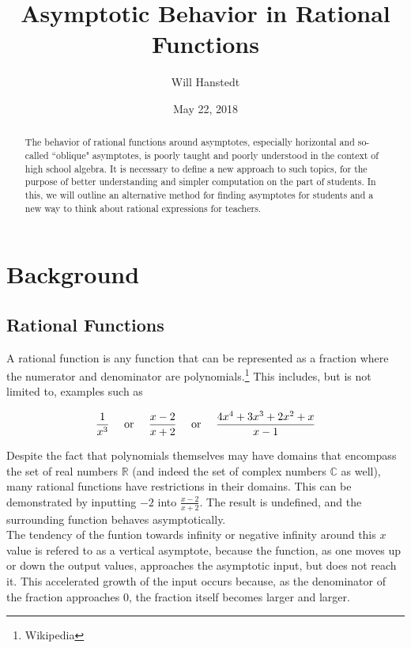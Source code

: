 \documentclass[12pt]{article}
\title{Asymptotic Behavior in Rational Functions}
\author{Will Hanstedt}
\date{May 22, 2018}
\begin{document}
\maketitle

\begin{abstract}
The behavior of rational functions around asymptotes, especially 		%
horizontal and so-called ``oblique" asymptotes, is poorly taught 
and poorly understood in the context of high school algebra. It is
necessary to define a new approach to such topics, for the purpose
of better understanding and simpler computation on the part of 
students. In this, we will outline an alternative method for 
finding asymptotes for students and a new way to think about 
rational expressions for teachers.
\end{abstract}

\section{Background}
\subsection{Rational Functions}

A rational function is any function that can be represented as a 
fraction where the numerator and denominator are 
polynomials.\footnote{Wikipedia}
This includes, but is not limited to, examples such as 

	\[\frac{1}{x^{3}}\ \ \ \ 
\textnormal{or}\ \ \ \  
	\frac{x-2}{x+2}\ \ \ \ 
\textnormal{or}\ \ \ \ 
	\frac{4x^{4}+3x^{3}+2x^{2}+x}{x-1}\]

Despite the fact that polynomials themselves may have domains 
that encompass the set of real numbers $\mathbb{R}$ (and indeed the set of
complex numbers $\mathbb{C}$ as well), many rational functions have restrictions 
in their domains. This can be demonstrated by inputting $-2$ into
	\(\frac{x-2}{x+2}\).
The result is undefined, and the surrounding function behaves asymptotically.\\

The tendency of the funtion towards infinity or negative infinity around
this $x$ value is refered to as a vertical asymptote, because the function,
as one moves up or down the output values, approaches the asymptotic input,
but does not reach it. This accelerated growth of the input occurs because,
as the denominator of the fraction approaches 0, the fraction itself becomes
larger and larger.\\
\end{document}
